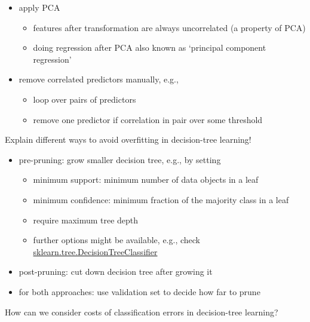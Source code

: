 \documentclass[12pt]{article}
\begin{document}
\begin{itemize}[left=0pt, nosep]
	\item apply PCA
	\begin{itemize}[left=0pt, nosep]
		\item features after transformation are always uncorrelated (a property of PCA)
		\item doing regression after PCA also known as `principal component regression'
	\end{itemize}
	\item remove correlated predictors manually, e.g.,
	\begin{itemize}[left=0pt, nosep]
		\item loop over pairs of predictors
		\item remove one predictor if correlation in pair over some threshold
	\end{itemize}
\end{itemize}

\begin{question}
	Explain different ways to avoid overfitting in decision-tree learning!
\end{question}

\begin{itemize}[left=0pt, nosep]
	\item pre-pruning: grow smaller decision tree, e.g., by setting
	\begin{itemize}[left=0pt, nosep]
		\item minimum support: minimum number of data objects in a leaf
		\item minimum confidence: minimum fraction of the majority class in a leaf
		\item require maximum tree depth
		\item further options might be available, e.g., check \href{https://scikit-learn.org/stable/modules/generated/sklearn.tree.DecisionTreeClassifier.html}{sklearn.tree.DecisionTreeClassifier}
	\end{itemize}
	\item post-pruning: cut down decision tree after growing it
	\item for both approaches: use validation set to decide how far to prune
\end{itemize}

\begin{question}
	How can we consider costs of classification errors in decision-tree learning?
\end{question}
\end{document}
